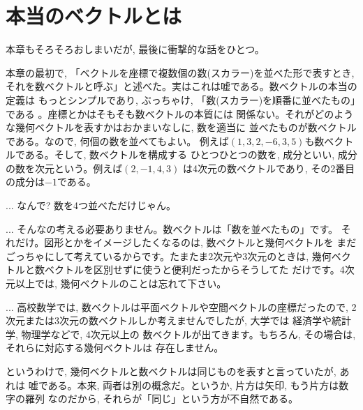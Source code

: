 \vv

\section{本当のベクトルとは}\label{sec:whatisvector}

本章もそろそろおしまいだが, 最後に衝撃的な話をひとつ。

本章の最初で, 「ベクトルを座標で複数個の数(スカラー)を並べた形で表すとき, 
それを数ベクトルと呼ぶ」と述べた。実はこれは嘘である。数ベクトルの本当の定義は
もっとシンプルであり, ぶっちゃけ, 「数(スカラー)を順番に並べたもの」である
。座標とかはそもそも数ベクトルの本質には
関係ない。それがどのような幾何ベクトルを表すかはおかまいなしに, 数を適当に
並べたものが数ベクトルである。なので, 何個の数を並べてもよい。
例えば$(1, 3, 2, -6, 3, 5)$も数ベクトルである。そして, 数ベクトルを構成する
ひとつひとつの数を, 成分といい, 成分の数を次元という。例えば$(2, -1, 4, 3)$
は4次元の数ベクトルであり, その2番目の成分は$-1$である。

\begin{faq}{\small{} ... 
なんで? 数を4つ並べただけじゃん。}\end{faq}\hv

\begin{faq}{\small{} ... 
そんなの考える必要ありません。数ベクトルは「数を並べたもの」です。
それだけ。図形とかをイメージしたくなるのは, 数ベクトルと幾何べクトルを
まだごっちゃにして考えているからです。たまたま2次元や3次元のときは, 
幾何ベクトルと数ベクトルを区別せずに使うと便利だったからそうしてた
だけです。4次元以上では, 幾何ベクトルのことは忘れて下さい。}\end{faq}\hv

\begin{faq}{\small{}
 ... 高校数学では, 数ベクトルは平面ベクトルや空間ベクトルの座標だったので, 
2次元または3次元の数ベクトルしか考えませんでしたが, 大学では
経済学や統計学, 物理学などで, 4次元以上の
数ベクトルが出てきます。もちろん, その場合は, それらに対応する幾何ベクトルは
存在しません。}\end{faq}\hv


というわけで, 幾何ベクトルと数ベクトルは同じものを表すと言っていたが, あれは
嘘である。本来, 両者は別の概念だ。というか, 片方は矢印, もう片方は数字の羅列
なのだから, それらが「同じ」という方が不自然である。

